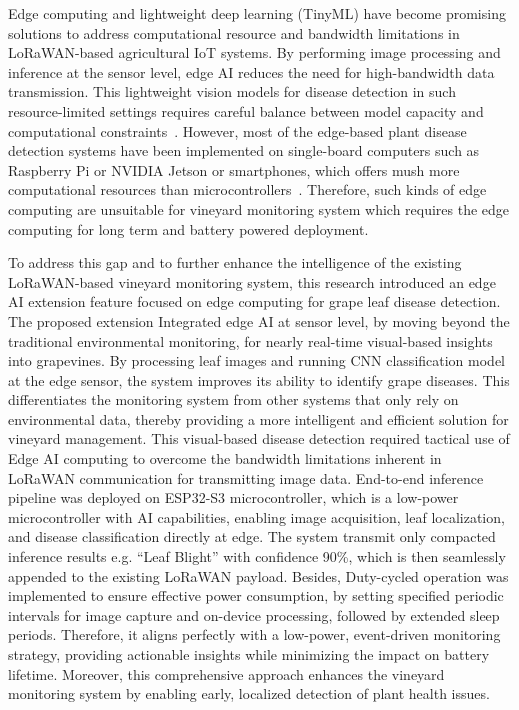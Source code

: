 Edge computing and lightweight deep learning (TinyML) have become promising solutions to address computational resource and bandwidth limitations in LoRaWAN-based agricultural IoT systems. By performing image processing and inference at the sensor level, edge AI reduces the need for high-bandwidth data transmission. This lightweight vision models for disease detection in such resource-limited settings requires careful balance between model capacity and computational constraints~\cite{joshi2024edge, santhosh2024edge, junaidi2025deep}. However, most  of the  edge-based plant disease detection systems have been implemented on single-board computers such as Raspberry Pi or NVIDIA Jetson or smartphones, which offers mush more computational resources than microcontrollers~\cite{karim2024enhancing, lazcano2025deep, tao2025icrop+, mamun2025grape}. Therefore, such kinds of edge computing are unsuitable for vineyard monitoring system which requires the edge computing for long term and battery powered deployment. 


To address this gap and to further enhance the intelligence of the existing LoRaWAN-based vineyard monitoring system, this research introduced an edge AI extension feature focused on edge computing for grape leaf disease detection. The proposed extension Integrated edge AI at sensor level, by moving beyond the traditional environmental monitoring, for nearly real-time visual-based insights into grapevines. By processing leaf images and running CNN classification model at the edge sensor, the system improves its ability to identify grape diseases. This differentiates the monitoring system from other systems that only rely on environmental data, thereby providing a more intelligent and efficient solution for vineyard management. This visual-based disease detection required tactical use of Edge AI computing to overcome the bandwidth limitations inherent in LoRaWAN communication for transmitting image data. End-to-end inference pipeline was deployed on ESP32-S3 microcontroller, which is a low-power microcontroller with AI capabilities, enabling image acquisition, leaf localization, and disease classification directly at edge. The system transmit only compacted inference results e.g. “Leaf Blight” with confidence 90\%, which is then seamlessly appended to the existing LoRaWAN payload. Besides, Duty-cycled operation was implemented  to ensure effective power consumption, by setting specified periodic intervals for image capture and on-device processing, followed by extended sleep periods. Therefore, it aligns perfectly with a low-power, event-driven monitoring strategy, providing actionable insights while minimizing the impact on battery lifetime. Moreover, this comprehensive approach enhances the vineyard monitoring system by enabling early, localized detection of plant health issues.


